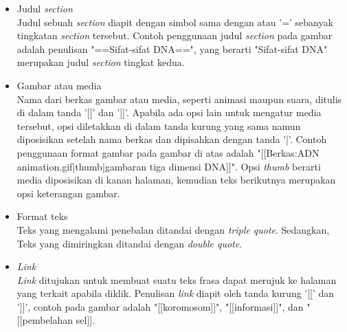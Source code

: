 \begin{itemize}
	\item Judul \textit{section}\\
	Judul sebuah \textit{section} diapit dengan simbol sama dengan atau '=' sebanyak tingkatan \textit{section} tersebut. Contoh penggunaan judul \textit{section} pada gambar adalah penulisan "==Sifat-sifat DNA==", yang berarti "Sifat-sifat DNA" merupakan judul \textit{section} tingkat kedua.
	\item Gambar atau media\\
	Nama dari berkas gambar atau media, seperti animasi maupun suara, ditulis di dalam tanda '[[' dan ']]'. Apabila ada opsi lain untuk mengatur media tersebut, opsi diletakkan di dalam tanda kurung yang sama namun diposisikan setelah nama berkas dan dipisahkan dengan tanda '|'. Contoh penggunaan format gambar pada gambar di atas adalah "[[Berkas:ADN animation.gif|thumb|gambaran tiga dimensi DNA]]". Opsi \textit{thumb} berarti media diposisikan di kanan halaman, kemudian teks berikutnya merupakan opsi keterangan gambar.
	\item Format teks\\
	Teks yang mengalami penebalan ditandai dengan \textit{triple quote}. Sedangkan, Teks yang dimiringkan ditandai dengan \textit{double quote}.
	\item \textit{Link}\\
	\textit{Link} ditujukan untuk membuat suatu teks frasa dapat merujuk ke halaman yang terkait apabila diklik. Penulisan \textit{link} diapit oleh tanda kurung '[[' dan ']]', contoh pada gambar adalah "[[koromosom]]", "[[informasi]]", dan "[[pembelahan sel]].
\end{itemize}


